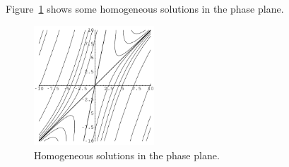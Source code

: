 \begin{Example}
  Figure~\ref{x_2154x} shows some homogeneous solutions in the phase plane.
  \begin{figure}[tb!]
    \begin{center}
      \includegraphics[width=0.4\textwidth]{ode/systems/x_2154x}
    \end{center}
    \caption{Homogeneous solutions in the phase plane.}
    \label{x_2154x}
  \end{figure}
\end{Example}











